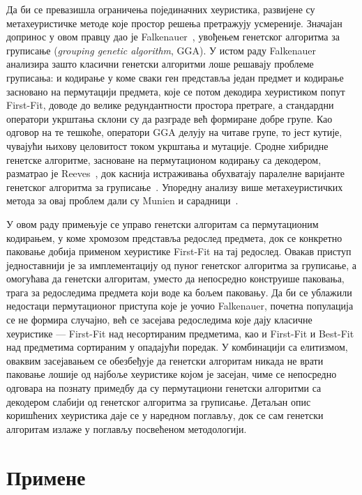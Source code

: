 Да би се превазишла ограничења појединачних хеуристика, развијене су метахеуристичке
методе које простор решења претражују усмереније. Значајан допринос у овом правцу дао је
Falkenauer~\cite{falkenauer1996}, увођењем генетског алгоритма за груписање
(\foreignlanguage{english}{\emph{grouping genetic algorithm}}, GGA). У истом раду
Falkenauer анализира зашто класични генетски алгоритми лоше решавају проблеме груписања:
и кодирање у коме сваки ген представља један предмет и кодирање засновано на пермутацији
предмета, које се потом декодира хеуристиком попут First-Fit, доводе до велике
редундантности простора претраге, а стандардни оператори укрштања склони су да разграде
већ формиране добре групе. Као одговор на те тешкоће, оператори GGA делују на
читаве групе, то јест кутије, чувајући њихову целовитост током укрштања и мутације. Сродне хибридне
генетске алгоритме, засноване на пермутационом кодирању са декодером, разматрао је
Reeves~\cite{reeves1996}, док каснија истраживања обухватају паралелне варијанте генетског
алгоритма за груписање~\cite{dokeroglu2014}. Упоредну анализу више метахеуристичких метода
за овај проблем дали су Munien и сарадници~\cite{munien2020}.

У овом раду примењује се управо генетски алгоритам са пермутационим кодирањем, у коме
хромозом представља редослед предмета, док се конкретно паковање добија применом
хеуристике First-Fit на тај редослед. Овакав приступ једноставнији је за имплементацију
од пуног генетског алгоритма за груписање, а омогућава да генетски алгоритам, уместо да
непосредно конструише паковања, трага за редоследима предмета који воде ка бољем паковању.
Да би се ублажили недостаци пермутационог приступа које је уочио Falkenauer, почетна
популација се не формира случајно, већ се засејава редоследима које дају класичне
хеуристике --- First-Fit над несортираним предметима, као и First-Fit и Best-Fit над
предметима сортираним у опадајући поредак. У комбинацији са елитизмом, оваквим засејавањем
се обезбеђује да генетски алгоритам никада не врати паковање лошије од најбоље хеуристике
којом је засејан, чиме се непосредно одговара на познату примедбу да су пермутациони
генетски алгоритми са декодером слабији од генетског алгоритма за груписање. Детаљан опис
коришћених хеуристика даје се у наредном поглављу, док се сам генетски алгоритам излаже у
поглављу посвећеном методологији.

\section{Примене}

